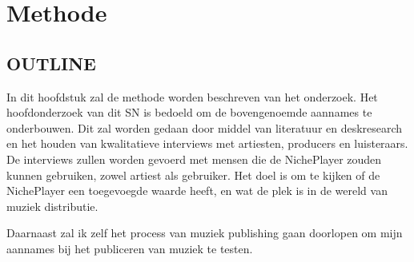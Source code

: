 \section{Methode}

\subsection*{OUTLINE}
In dit hoofdstuk zal de methode worden beschreven van het onderzoek. Het hoofdonderzoek van dit SN is bedoeld om de bovengenoemde aannames te onderbouwen. Dit zal worden gedaan door middel van literatuur en deskresearch en het houden van kwalitatieve interviews met artiesten, producers en luisteraars. De interviews zullen worden gevoerd met mensen die de NichePlayer zouden kunnen gebruiken, zowel artiest als gebruiker. Het doel is om te kijken of de NichePlayer een toegevoegde waarde heeft, en wat de plek is in de wereld van muziek distributie.

Daarnaast zal ik zelf het process van muziek publishing gaan doorlopen om mijn aannames bij het publiceren van muziek te testen.
